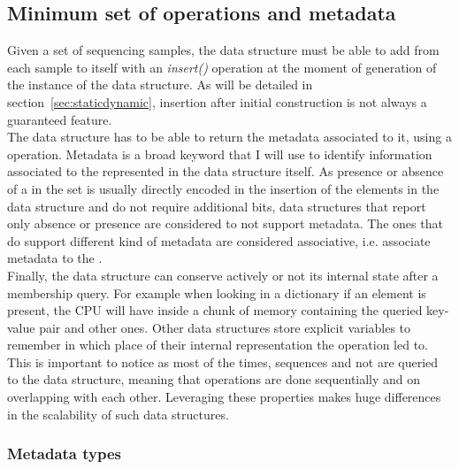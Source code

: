 \subsection{Minimum set of operations and metadata}
Given a set of sequencing samples, the data structure must be able to add \kmers from each sample to itself with an \emph{insert()} operation at the moment of generation of the instance of the data structure. As will be detailed in section~\ref{sec:staticdynamic}, insertion after initial construction is not always a guaranteed feature.\\
The data structure has to be able to return the metadata associated to it, using a \memb operation. Metadata is a broad keyword that I will use to identify information associated to the \kmers represented in the data structure itself. As presence or absence of a \kmer in the set is usually directly encoded in the insertion of the elements in the data structure and do not require additional bits, data structures that report only absence or presence are considered to not support metadata. The ones that do support different kind of metadata are considered associative, i.e. associate metadata to the \kmers.\\
Finally, the data structure can conserve actively or not its internal state after a membership query. For example when looking in a dictionary if an element is present, the CPU will have inside a chunk of memory containing the queried key-value pair and other ones. Other data structures store explicit variables to remember in which place of their internal representation the \memb operation led to. This is important to notice as most of the times, sequences and not \kmers are queried to the data structure, meaning that \memb operations are done sequentially and on \kmers overlapping with each other. Leveraging these properties makes huge differences in the scalability of such data structures.

\subsubsection{Metadata types}

